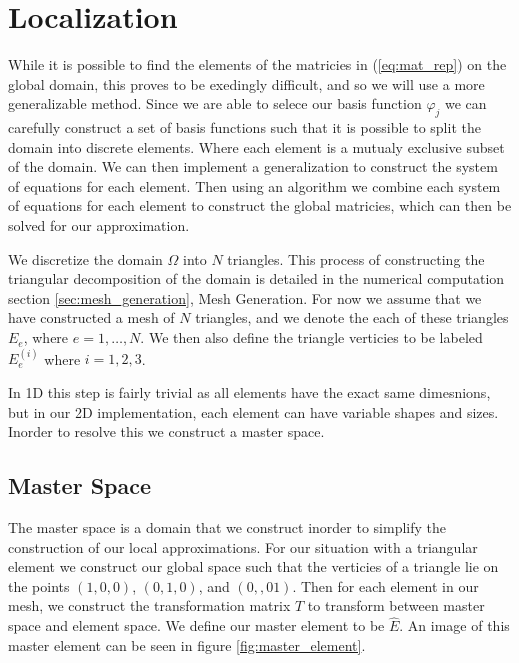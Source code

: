 \documentclass[../fem.tex]{subfiles}
\begin{document}
\section{Localization}%
\label{sec:localization}

While it is possible to find the elements of the matricies in
(\ref{eq:mat_rep}) on the global domain, this proves to be exedingly difficult,
and so we will use a more generalizable method. Since we are able to selece our
basis function $\varphi_j$ we can carefully construct a set of basis functions
such that it is possible to split the domain into discrete elements. Where each
element is a mutualy exclusive subset of the domain. We can then implement a
generalization to construct the system of equations for each element. Then
using an algorithm we combine each system of equations for each element to
construct the global matricies, which can then be solved for our approximation.

We discretize the domain $\Omega$ into $N$ triangles. This process of
constructing the triangular decomposition of the domain is detailed in the
numerical computation section \ref{sec:mesh_generation},  Mesh Generation. For
now we assume that we have constructed a mesh of $N$ triangles, and we denote
the each of these triangles $E_e$, where $e=1,\ldots,N$. We then also define
the triangle verticies to be labeled $E_e^{(i)}$ where $i=1,2,3$.

In 1D this step is fairly trivial as all elements have the exact same
dimesnions, but in our 2D implementation, each element can have variable shapes
and sizes. Inorder to resolve this we construct a master space.

\subsection{Master Space}%
\label{sub:master_space}

The master space is a domain that we construct inorder to simplify the
construction of our local approximations. For our situation with a triangular
element we construct our global space such that the verticies of a triangle lie
on the points $(1,0,0)$, $(0,1,0)$, and $(0,,01)$. Then for each element in our
mesh, we construct the transformation matrix $T$ to transform between master
space and element space. We define our master element to be $\hat{E}$. An image
of this master element can be seen in figure \ref{fig:master_element}.

\begin{Figure}
   \begin{center}
   \end{center}
   \label{fig:master_element}
\end{Figure}
\end{document}
